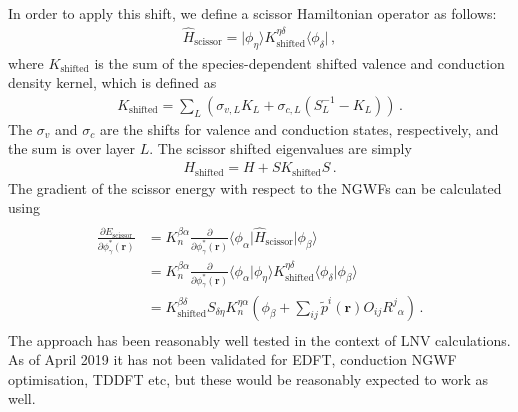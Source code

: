 \documentclass[letterpaper,10pt,english]{sphinxmanual}
\begin{document}
In order to apply this shift, we define a scissor Hamiltonian operator
as follows:
\begin{equation*}
\begin{split}\hat{H}_\text{scissor} = \lvert\phi_\eta\rangle K_\text{shifted}^{\eta\delta}
    \langle\phi_\delta\rvert \, ,\end{split}
\end{equation*}
where \(K_\text{shifted}\) is the sum of the species-dependent
shifted valence and conduction density kernel, which is defined as
\begin{equation*}
\begin{split}K_\text{shifted} = \sum_L \left( \sigma_{v, L} K_L + \sigma_{c, L} (S^{-1}_L - K_L) \right)\,.\end{split}
\end{equation*}
The \(\sigma_v\) and \(\sigma_c\) are the shifts for valence
and conduction states, respectively, and the sum is over layer
\(L\). The scissor shifted eigenvalues are simply
\begin{equation*}
\begin{split}H_\text{shifted} = H + S K_\text{shifted} S \, .\end{split}
\end{equation*}
The gradient of the scissor energy with respect to the NGWFs can be
calculated using
\begin{equation*}
\begin{split}\begin{aligned}
    \begin{split}
        \frac{\partial E_\text{scissor}}{\partial\phi_\gamma^*(\mathbf{r})}
        &=
        K_n^{\beta\alpha} \frac{\partial}{\partial\phi_\gamma^*(\mathbf{r})}
        \langle \phi_\alpha\rvert\hat{H}_\text{scissor}\lvert\phi_\beta\rangle \\
        &=
        K_n^{\beta\alpha} \frac{\partial}{\partial\phi_\gamma^*(\mathbf{r})}
        \langle\phi_\alpha\rvert\phi_\eta\rangle K_\text{shifted}^{\eta\delta}
        \langle\phi_\delta\rvert\phi_\beta\rangle \\
        &=
        K_\text{shifted}^{\beta\delta} S_{\delta\eta} K_n^{\eta\alpha} \left(
            \phi_\beta + \sum_{ij} \tilde{p}^i(\mathbf{r}) O_{ij} {R^j}_\alpha
        \right) \, .
    \end{split}\end{aligned}\end{split}
\end{equation*}
The approach has been reasonably well tested in the context of LNV
calculations. As of April 2019 it has not been validated for EDFT,
conduction NGWF optimisation, TDDFT etc, but these would be reasonably
expected to work as well.
\end{document}
